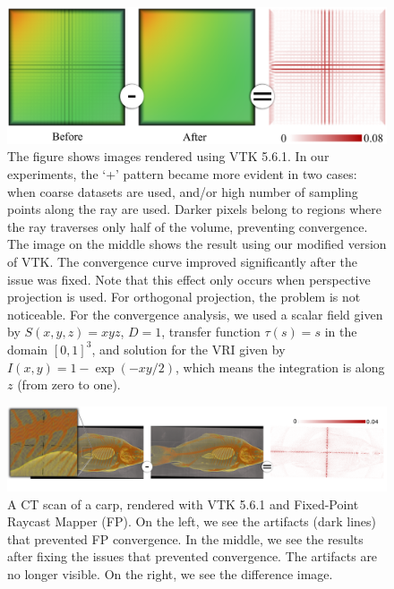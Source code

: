 \begin{figure}[t]
\centering
\includegraphics[width=0.8\linewidth]{chapter5/figures/fp-fcm-before-after.png}
\caption{\label{fig:fp-rcm-example} The figure shows images rendered
  using VTK 5.6.1. In our experiments, the `+'  pattern became more evident
  in two cases:  when coarse datasets are used, and/or high number
   of sampling points along the ray are used. 
   Darker pixels belong to regions where the
  ray traverses only half of the volume, preventing convergence. The
  image on the middle shows the result using our modified version of
  VTK. The convergence curve improved significantly after the 
  issue was fixed. Note that this
  effect only occurs when perspective projection is used. For
  orthogonal projection, the problem is not noticeable. 
  For the convergence analysis, we used a scalar field
  given by $S(x,y,z) = xyz$, $D=1$, transfer function $\tau(s) = s$ in the
  domain $\left[0,1\right]^3$, and solution for the VRI given by
  $I(x,y) = 1-\exp\left( -x y / 2 \right)$, which means the integration is 
  along $z$ (from zero to one).}
\end{figure}

\begin{figure}[t]
\centering
\includegraphics[width=1\linewidth]{chapter5/figures/carp-difference.png}
\caption{\label{fig:real-dataset-examples}
  A CT scan of a carp,
  rendered with VTK 5.6.1 and Fixed-Point Raycast Mapper (FP). On the
  left, we see the artifacts (dark lines) that prevented FP convergence. In the
  middle, we see the results after fixing the issues that prevented
  convergence. The artifacts are no longer visible. On the right, we
  see the difference image.}
\end{figure}



